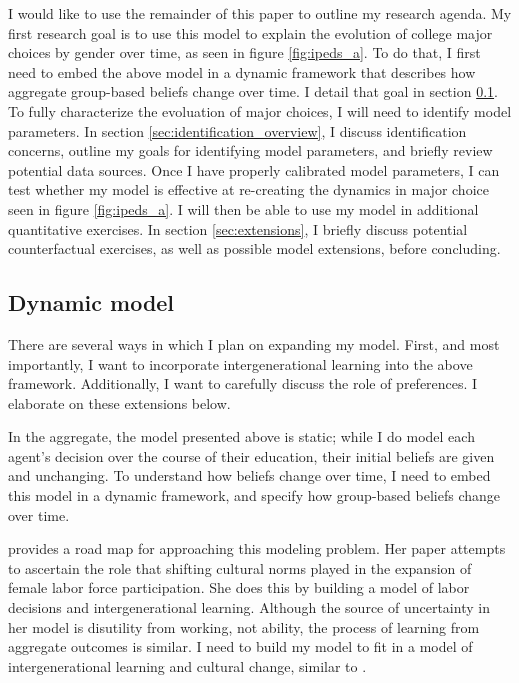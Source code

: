 \documentclass[11 pt]{article}
\newcommand{\toedit}[1]{{\color{gray}#1}}
\newcommand{\toedit}[1]{#1}
\begin{document}
I would like to use the remainder of this paper to outline my research agenda. 
My first research goal is to use this model to explain the evolution of college major choices by gender over time, as seen in figure \ref{fig:ipeds_a}.
To do that, I first need to embed the above model in a dynamic framework that describes how aggregate group-based beliefs change over time. 
I detail that goal in section \ref{sec:dynamic_model}.
To fully characterize the evoluation of major choices, I will need to identify model parameters.
In section \ref{sec:identification_overview}, I discuss identification concerns, outline my goals for identifying model parameters, and briefly review potential data sources.
Once I have properly calibrated model parameters, I can test whether my model is effective at re-creating the dynamics in major choice seen in figure \ref{fig:ipeds_a}.
I will then be able to use my model in additional quantitative exercises.
In section \ref{sec:extensions}, I briefly discuss potential counterfactual exercises, as well as possible model extensions, before concluding. 

\subsection{Dynamic model}\label{sec:dynamic_model}

There are several ways in which I plan on expanding my model.
First, and most importantly, I want to incorporate intergenerational learning into the above framework.
Additionally, I want to carefully discuss the role of preferences. I elaborate on these extensions below.

In the aggregate, the model presented above is static; while I do model each agent's decision over the course of their education, their initial beliefs are given and unchanging.
To understand how beliefs change over time, I need to embed this model in a dynamic framework, and specify how group-based beliefs change over time.

\toedit{\textcite{F13} provides a road map for approaching this modeling problem.
Her paper attempts to ascertain the role that shifting cultural norms played in the expansion of female labor force participation.
She does this by building a model of labor decisions and intergenerational learning.
Although the source of uncertainty in her model is disutility from working, not ability, the process of learning from aggregate outcomes is similar. 
I need to build my model to fit in a model of intergenerational learning and cultural change, similar to \textcite{F13}.}
\end{document}
